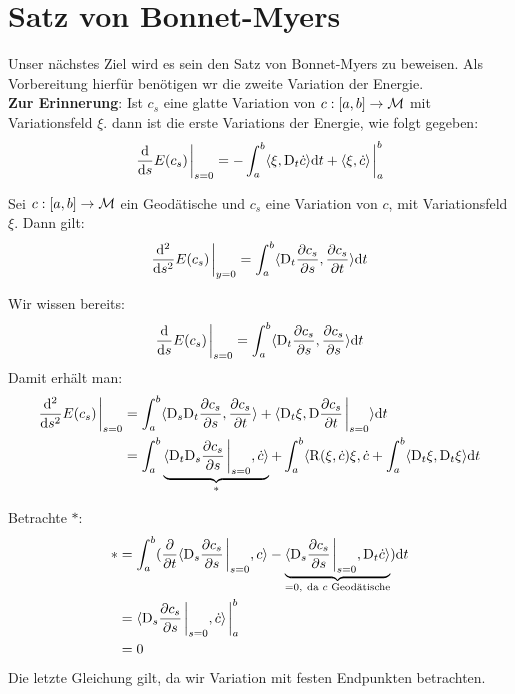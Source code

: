 \section{Satz von Bonnet-Myers}

Unser nächstes Ziel wird es sein den Satz von Bonnet-Myers zu beweisen.
Als Vorbereitung hierfür benötigen wr die zweite Variation der Energie.\\
\textbf{Zur Erinnerung}:
Ist $c_s$ eine glatte Variation von $c: [a, b] \to \mathcal{M}$ mit Variationsfeld
$\xi$.
dann ist die erste Variations der Energie, wie folgt gegeben:
\begin{align}
    \dv{s} E(c_s) \eval_{s=0} = - \int^b_a \langle \xi , \covd_t \dot{c} \rangle \dd t
    + \langle \xi , \dot{c} \rangle \eval^b_a
\end{align}

\begin{satz}
Sei $c: [a, b]\to \mathcal{M}$ ein Geodätische und $c_s$ eine Variation von $c$,
mit Variationsfeld $\xi$.
Dann gilt:
\begin{align}
    \dv[2]{s} E(c_s) \eval_{y=0} = \int^b_a  \langle \covd_t \pdv{c_s}{s} , 
    \pdv{c_s}{t} \rangle \dd t
\end{align}

\end{satz}

\begin{bew}
Wir wissen bereits:
\begin{align*}
    \dv{s} E(c_s) \eval_{s=0} = \int^b_a \langle \covd_t \pdv{c_s}{s} , 
    \pdv{c_s}{s} \rangle \dd t
\end{align*}
Damit erhält man:
\begin{align*}
\dv[2]{s}E(c_s)\eval_{s=0}&=\int^b_a \langle\covd_s\covd_t\pdv{c_s}{s},\pdv{c_s}{t}\rangle + 
\langle \covd_t \xi , \covd \pdv{c_s}{t} \eval_{s=0} \rangle \dd t \\
&= \int^b_a \underbrace{\langle\covd_t\covd_s\pdv{c_s}{s}\eval_{s=0},\dot{c}\rangle}_{\ast}
+ \int^b_a \langle \curv (\xi , \dot{c})\xi , \dot{c}
+ \int^b_a \langle\covd_t\xi , \covd_t \xi\rangle\dd t 
\end{align*}

Betrachte $\ast$:
\begin{align*}
\ast &= \int^b_a ( \pdv{t} \langle \covd_s \pdv{c_s}{s}\eval_{s=0}, 
c \rangle - \underbrace{\langle\covd_s \pdv{c_s}{s} \eval_{s=0} , \covd_t \dot{c}\rangle}_{=0, \ \text{da $c$ Geodätische}} ) \dd t \\
&= \langle \covd_s \pdv{c_s}{s}\eval_{s=0}, \dot{c} \rangle \eval^b_a \\
&= 0
\end{align*}
Die letzte Gleichung gilt, da wir Variation mit festen Endpunkten betrachten.
\end{bew}

